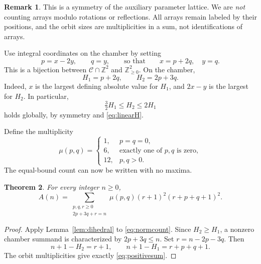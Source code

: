 \documentclass[11pt]{article}
\numberwithin{equation}{section}
\newtheorem{theorem}{Theorem}[section]
\theoremstyle{definition}
\newtheorem{remark}[theorem]{Remark}
\newcommand{\Z}{\mathbb Z}
\newcommand{\N}{\mathbb Z_{\geq 0}}
\begin{document}
\begin{remark}
This is a symmetry of the auxiliary parameter lattice. We are \emph{not}
counting arrays modulo rotations or reflections. All arrays remain labeled
by their positions, and the orbit sizes are multiplicities in a sum, not
identifications of arrays.
\end{remark}

Use integral coordinates on the chamber by setting
\begin{equation}\label{eq:pq}
 p=x-2y,\qquad q=y,
 \qquad\text{so that}\qquad x=p+2q,\quad y=q.
\end{equation}
This is a bijection between $\mathcal C\cap\Z^2$ and $\N^2$. On the chamber,
\begin{equation}\label{eq:linearH}
 H_1=p+2q,\qquad H_2=2p+3q.
\end{equation}
Indeed, $x$ is the largest defining absolute value for $H_1$, and $2x-y$
is the largest for $H_2$. In particular,
\begin{equation}\label{eq:compareH}
 \tfrac32H_1\leq H_2\leq2H_1
\end{equation}
holds globally, by symmetry and \eqref{eq:linearH}.

Define the multiplicity
\begin{equation}\label{eq:mu}
 \mu(p,q)=
 \begin{cases}
 1,&p=q=0,\\
 6,&\text{exactly one of }p,q\text{ is zero},\\
 12,&p,q>0.
 \end{cases}
\end{equation}
The equal-bound count can now be written with no maxima.

\begin{theorem}\label{thm:sum}
For every integer $n\geq0$,
\begin{equation}\label{eq:positivesum}
 \boxed{\displaystyle
 A(n)=\sum_{\substack{p,q,r\geq0\\2p+3q+r=n}}
 \mu(p,q)(r+1)^2(r+p+q+1)^2.}
\end{equation}
\end{theorem}

\begin{proof}
Apply Lemma~\ref{lem:dihedral} to \eqref{eq:normcount}. Since
$H_2\geq H_1$, a nonzero chamber summand is characterized by
$2p+3q\leq n$. Set $r=n-2p-3q$. Then
\[
 n+1-H_2=r+1,\qquad n+1-H_1=r+p+q+1.
\]
The orbit multiplicities give exactly \eqref{eq:positivesum}.
\end{proof}
\end{document}
